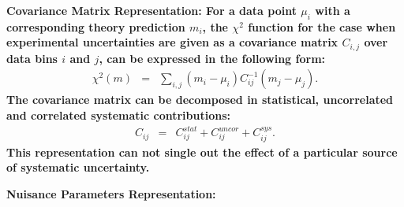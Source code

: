 \begin{description}
\item \bf {Covariance Matrix Representation:} \rm
For a data point  $\mu_i$ with a corresponding theory prediction $m_i$, the $\chi^2$ function for the case when experimental uncertainties are given as 
a covariance matrix $C_{i,j}$ over data bins $i$ and $j$, can be expressed in the following form:
%
\begin{eqnarray}
\chi^2 (m)& = & \sum_{i,j}(m_i-\mu_i)C^{-1}_{ij}(m_j-\mu_j).
\end{eqnarray}
The covariance matrix can be decomposed in statistical, uncorrelated and correlated systematic contributions: 
\begin{eqnarray}
C_{ij}& = & C^{stat}_{ij}+C^{uncor}_{ij}+C^{sys}_{ij}.
\end{eqnarray}
This representation can not single out the effect of a particular
source of systematic uncertainty.

\item \bf{Nuisance Parameters Representation:} \rm
\label{sec:nuisance_representation}


\end{description}
